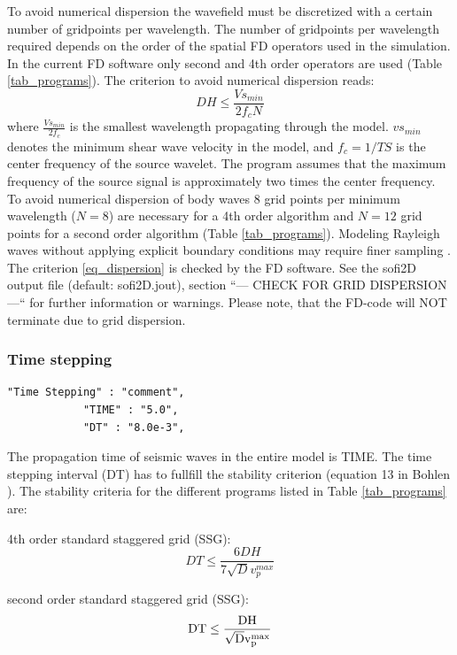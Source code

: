 \documentclass[11pt,onecolumn,oneside]{article}
\begin{document}
To avoid numerical dispersion the wavefield must be discretized with a certain number of gridpoints per wavelength. The number of gridpoints per wavelength required depends on the order of the spatial
FD operators used in the simulation. In the current FD software only second and 4th order operators are used (Table \ref{tab_programs}). The criterion to avoid numerical dispersion reads:
\begin{equation}
DH\le\frac{Vs_{min}}{2 f_c N} \label{eq_dispersion}
\end{equation}
where $\frac{Vs_{min}}{2 f_c}$ is the smallest wavelength propagating through the model. $vs_{min}$ denotes the minimum shear wave velocity in the model, and $f_c=1/TS$ is the center frequency of the source wavelet. The program assumes that the maximum frequency of the source signal is approximately two times the center frequency. To avoid numerical dispersion of body waves 8 grid points per minimum wavelength ($N=8$) are necessary for a 4th order algorithm and  $N=12$ grid points for a second order algorithm (Table \ref{tab_programs}). Modeling Rayleigh waves without applying explicit boundary conditions may require finer sampling \cite{bohlen:06}. The criterion \ref{eq_dispersion} is checked by the FD software. See the sofi2D output file (default: sofi2D.jout), section ``--- CHECK FOR GRID DISPERSION ---`` for further information or warnings. Please note, that the FD-code will NOT terminate due to grid dispersion.

\subsubsection{Time stepping}
\begin{verbatim}
"Time Stepping" : "comment",
			"TIME" : "5.0",
			"DT" : "8.0e-3",
\end{verbatim}
The propagation time of seismic waves in the entire model is TIME. The time stepping interval (DT) has to fullfill the stability criterion (equation 13 in Bohlen ). The stability criteria for the different programs listed in Table \ref{tab_programs} are: 

4th order standard staggered grid (SSG):
\begin{equation}
DT \le \frac{6 DH}{7\sqrt{D} v_p^{max}}
\label{eq_stab_ssg4}
\end{equation}

second order standard staggered grid (SSG):
\begin{equation}
\rm{DT} \le \frac{DH}{\sqrt{D} v_p^{max}}
\label{eq_stab_ssg2}
\end{equation}
\end{document}
